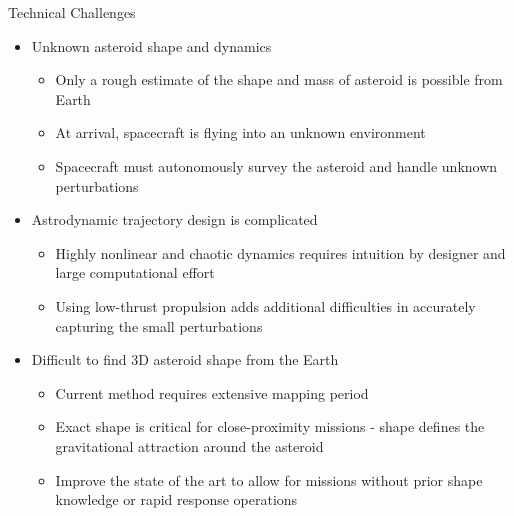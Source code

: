 \documentclass[final, usenames, dvipsnames]{beamer}
\newlength{\onecolwidth}
\begin{document}
\begin{frame}[t]
\begin{columns}[T,onlytextwidth]
\begin{column}{\onecolwidth}
        \begin{block}{Technical Challenges}
            \begin{itemize}
                \item Unknown asteroid shape and dynamics
                    \begin{itemize}
                        \item Only a rough estimate of the shape and mass of asteroid is possible from Earth
                        \item At arrival, spacecraft is flying into an unknown environment 
                        \item Spacecraft must autonomously survey the asteroid and handle unknown perturbations
                    \end{itemize}
                \item Astrodynamic trajectory design is complicated
                    \begin{itemize}
                        \item Highly nonlinear and chaotic dynamics requires intuition by designer and large computational effort
                        \item Using low-thrust propulsion adds additional difficulties in accurately capturing the small perturbations
                    \end{itemize}
                \item Difficult to find 3D asteroid shape from the Earth
                    \begin{itemize}
                        \item Current method requires extensive mapping period
                        \item Exact shape is critical for close-proximity missions - shape defines the gravitational attraction around the asteroid
                        \item Improve the state of the art to allow for missions without prior shape knowledge or rapid response operations
                    \end{itemize}
            \end{itemize}
            \vspace*{0.2cm}
        \end{block} 


\end{column}
\end{columns}
\end{frame}
\end{document}
